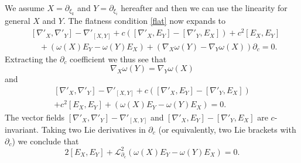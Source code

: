 \documentclass{article}
\numberwithin{equation}{section}
\theoremstyle{plain}
\begin{document}
We assume $X=\partial_{\xi_k}$ and $Y=\partial_{\xi_i}$ hereafter and then we can use the linearity for general $X$ and $Y$. The flatness condition \eqref{flat} now expands to 
\begin{align*}
    &[\nabla'_X,\nabla'_Y] - \nabla'_{[X,Y]} + c ([\nabla'_X,E_Y] - [\nabla'_Y, E_X]) + c^2 [E_X,E_Y] \\
    &\quad + (\omega(X) E_Y - \omega(Y) E_X) + (\nabla_X \omega(Y) - \nabla_Y \omega(X)) \partial_c = 0.
\end{align*}
Extracting the $\partial_c$ coefficient we thus see that
\begin{equation}\label{nabla-torsion}
    \nabla_X \omega(Y) = \nabla_Y \omega(X)
\end{equation}
and
\begin{multline}\label{nab-com}
    [\nabla'_X,\nabla'_Y] - \nabla'_{[X,Y]} + c ([\nabla'_X,E_Y] - [\nabla'_Y, E_X])\\
    + c^2 [E_X,E_Y] + (\omega(X) E_Y - \omega(Y) E_X) = 0.
\end{multline}
The vector fields $[\nabla'_X,\nabla'_Y] - \nabla'_{[X,Y]}$ and $[\nabla'_X,E_Y] - [\nabla'_Y, E_X]$ are $c$-invariant.  Taking two Lie derivatives in $\partial_c$ (or equivalently, two Lie brackets with $\partial_c$) we conclude that
\begin{equation}\label{2xy}
 2 [E_X,E_Y] + {\mathcal L}_{\partial_c}^2 (\omega(X) E_Y - \omega(Y) E_X) = 0.
\end{equation}

\smallskip
\end{document}
